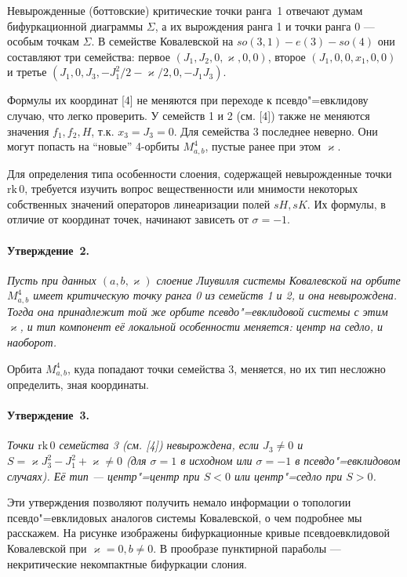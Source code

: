 Невырожденные (боттовские) критические точки ранга~1 отвечают думам бифуркационной диаграммы $\Sigma$, а их вырождения ранга 1 и точки ранга 0 --- особым точкам $\Sigma$. В семействе Ковалевской на $so(3,1)-e(3)-so(4)$ они составляют три семейства: первое $(J_1, J_2, 0, \varkappa, 0 , 0)$, второе $(J_1, 0, 0, x_1, 0 , 0)$ и третье $(J_1, 0, J_3, -J_1^2/2 -\varkappa/2, 0 , -J_1 J_3)$.

Формулы их координат [4] не меняются при переходе к псевдо"=евклидову случаю, что легко проверить. У семейств 1 и 2 (см. [4]) также не меняются значения $f_1, f_2, H$, т.к. $x_3 = J_3 = 0$. Для семейства $3$ последнее неверно. Они могут попасть на ``новые'' 4-орбиты $M^4_{a, b}$, пустые ранее при этом $\varkappa$.

Для определения типа особенности слоения, содержащей невырожденные точки $\mathrm{rk}\,0$, требуется изучить вопрос вещественности или мнимости некоторых собственных значений операторов линеаризации полей $sH, sK$. Их формулы, в отличие от координат точек, начинают зависеть от $\sigma = -1$.

\paragraph{Утверждение~2.}
{\it
	Пусть при данных $(a, b, \varkappa)$ слоение Лиувилля системы Ковалевской на орбите $M^4_{a, b}$ имеет критическую точку ранга 0 из семейств 1 и 2, и она невырождена. Тогда она принадлежит той же орбите псевдо"=евклидовой системы с этим $\varkappa$, и тип компонент её локальной особенности меняется: центр на седло, и наоборот.
}

Орбита $M^4_{a, b}$, куда попадают точки семейства 3, меняется, но их тип несложно определить, зная координаты.

\paragraph{Утверждение~3.}
{\it
	Точки $\mathrm{rk}\,0$ семейства 3 (см. [4]) невырождена, если $J_3 \ne 0$ и $S = \varkappa J_3^2 - J_1^2 + \varkappa \ne 0$ (для $\sigma = 1$ в исходном или $\sigma = -1$ в псевдо"=евклидовом случаях). Её тип --- центр"=центр при $S<0$ или центр"=седло при $S >0$.
}

Эти утверждения позволяют получить немало информации о топологии псевдо"=евклидовых аналогов системы Ковалевской, о чем подробнее мы расскажем. На рисунке изображены бифуркационные кривые псевдоевклидовой Ковалевской при $\varkappa = 0, b \ne 0$. В прообразе пунктирной параболы --- некритические некомпактные бифуркации слония.

